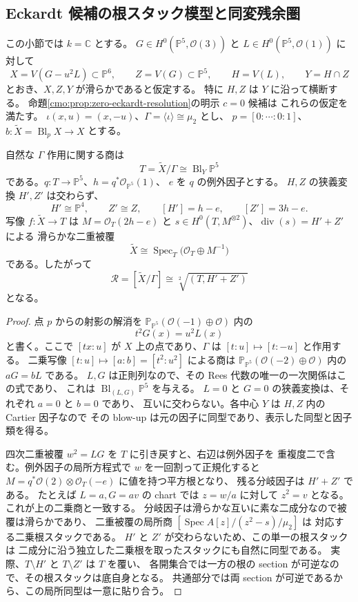 \subsection{Eckardt 候補の根スタック模型と同変残余圏}
\label{cmo:subsec:eckardt-root-model}

この小節では $k=\mathbb C$ とする。
$G\in H^0(\mathbb P^5,\mathcal O(3))$ と
$L\in H^0(\mathbb P^5,\mathcal O(1))$ に対して
\[
 X=V(G-u^2L)\subset\mathbb P^6,\qquad
 Z=V(G)\subset\mathbb P^5,\qquad H=V(L),\qquad Y=H\cap Z
\]
とおき、$X,Z,Y$ が滑らかであると仮定する。
特に $H,Z$ は $Y$ に沿って横断する。
命題\ref{cmo:prop:zero-eckardt-resolution}の明示 $c=0$ 候補は
これらの仮定を満たす。
$\iota(x,u)=(x,-u)$、$\Gamma=\langle\iota\rangle\cong\mu_2$ とし、
$p=[0:\cdots:0:1]$、$b:\widetilde X=\operatorname{Bl}_pX\to X$ とする。

\begin{proposition}[滑らかな商と二つの分離された分岐成分]
\label{cmo:prop:eckardt-smooth-quotient}
自然な $\Gamma$ 作用に関する商は
\[
 T=\widetilde X/\Gamma\cong\operatorname{Bl}_Y\mathbb P^5
\]
である。$q:T\to\mathbb P^5$、$h=q^*\mathcal O_{\mathbb P^5}(1)$、
$e$ を $q$ の例外因子とする。
$H,Z$ の狭義変換 $H',Z'$ は交わらず、
\[
 H'\cong\mathbb P^4,\qquad Z'\cong Z,\qquad
 [H']=h-e,\qquad[Z']=3h-e.
\]
写像 $f:\widetilde X\to T$ は
$M=\mathcal O_T(2h-e)$ と
$s\in H^0(T,M^{\otimes2})$、$\operatorname{div}(s)=H'+Z'$ による
滑らかな二重被覆
\[
 \widetilde X\cong\operatorname{Spec}_T
 \bigl(\mathcal O_T\oplus M^{-1}\bigr)
\]
である。したがって
\[
 \mathcal R=[\widetilde X/\Gamma]
 \cong\sqrt[2]{(T,H'+Z')}
\]
となる。
\end{proposition}

\begin{proof}
点 $p$ からの射影の解消を
$\mathbb P_{\mathbb P^5}(\mathcal O(-1)\oplus\mathcal O)$ 内の
\[
 t^2G(x)=u^2L(x)
\]
と書く。ここで $[tx:u]$ が $X$ 上の点であり、$\Gamma$ は
$[t:u]\mapsto[t:-u]$ と作用する。
二乗写像 $[t:u]\mapsto[a:b]=[t^2:u^2]$ による商は
$\mathbb P_{\mathbb P^5}(\mathcal O(-2)\oplus\mathcal O)$ 内の
$aG=bL$ である。
$L,G$ は正則列なので、その Rees 代数の唯一の一次関係はこの式であり、
これは $\operatorname{Bl}_{(L,G)}\mathbb P^5$ を与える。
$L=0$ と $G=0$ の狭義変換は、それぞれ $a=0$ と $b=0$ であり、
互いに交わらない。各中心 $Y$ は $H,Z$ 内の Cartier 因子なので
その blow-up は元の因子に同型であり、表示した同型と因子類を得る。

四次二重被覆 $w^2=LG$ を $T$ に引き戻すと、右辺は例外因子を
重複度二で含む。例外因子の局所方程式で $w$ を一回割って正規化すると
$M=q^*\mathcal O(2)\otimes\mathcal O_T(-e)$ に値を持つ平方根となり、
残る分岐因子は $H'+Z'$ である。
たとえば $L=a,G=av$ の chart では $z=w/a$ に対して $z^2=v$ となる。
これが上の二乗商と一致する。
分岐因子は滑らかな互いに素な二成分なので被覆は滑らかであり、
二重被覆の局所商 $[\operatorname{Spec}A[z]/(z^2-s)/\mu_2]$ は
対応する二乗根スタックである。
$H'$ と $Z'$ が交わらないため、この単一の根スタックは
二成分に沿う独立した二乗根を取ったスタックにも自然に同型である。
実際、$T\setminus H'$ と $T\setminus Z'$ は $T$ を覆い、
各開集合では一方の根の section が可逆なので、その根スタックは底自身となる。
共通部分では両 section が可逆であるから、この局所同型は一意に貼り合う。
\end{proof}

